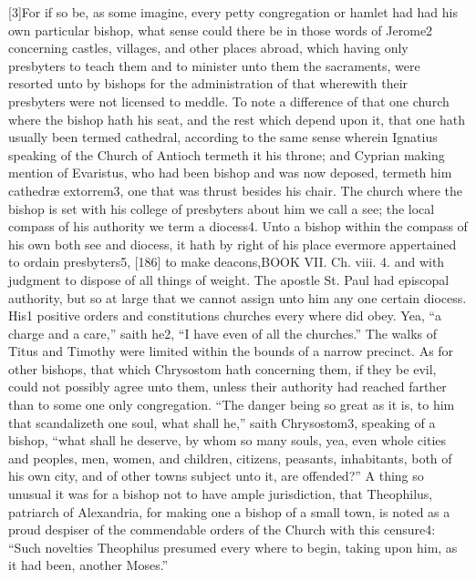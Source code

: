 [3]For if so be, as some imagine, every petty congregation or hamlet had had his own particular bishop, what sense could there be in those words of Jerome2 concerning castles, villages, and other places abroad, which having only presbyters to teach them and to minister unto them the sacraments, were resorted unto by bishops for the administration of that wherewith their presbyters were not licensed to meddle. To note a difference of that one church where the bishop hath his seat, and the rest which depend upon it, that one hath usually been termed cathedral, according to the same sense wherein Ignatius speaking of the Church of Antioch termeth it his throne; and Cyprian making mention of Evaristus, who had been bishop and was now deposed, termeth him cathedræ extorrem3, one that was thrust besides his chair. The church where the bishop is set with his college of presbyters about him we call a see; the local compass of his authority we term a diocess4. Unto a bishop within the compass of his own both see and diocess, it hath by right of his place evermore appertained to ordain presbyters5, [186] to make deacons,BOOK VII. Ch. viii. 4. and with judgment to dispose of all things of weight. The apostle St. Paul had episcopal authority, but so at large that we cannot assign unto him any one certain diocess. His1 positive orders and constitutions churches every where did obey. Yea, “a charge and a care,” saith he2, “I have even of all the churches.” The walks of Titus and Timothy were limited within the bounds of a narrow precinct. As for other bishops, that which Chrysostom hath concerning them, if they be evil, could not possibly agree unto them, unless their authority had reached farther than to some one only congregation. “The danger being so great as it is, to him that scandalizeth one soul, what shall he,” saith Chrysostom3, speaking of a bishop, “what shall he deserve, by whom so many souls, yea, even whole cities and peoples, men, women, and children, citizens, peasants, inhabitants, both of his own city, and of other towns subject unto it, are offended?” A thing so unusual it was for a bishop not to have ample jurisdiction, that Theophilus, patriarch of Alexandria, for making one a bishop of a small town, is noted as a proud despiser of the commendable orders of the Church with this censure4: “Such novelties Theophilus presumed every where to begin, taking upon him, as it had been, another Moses.”


